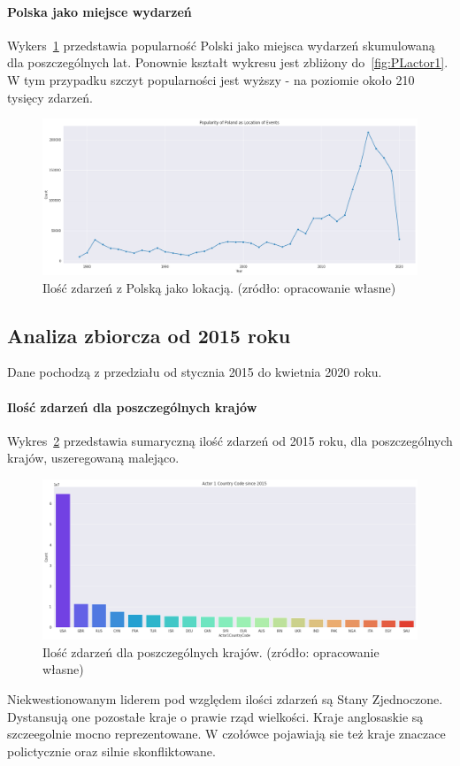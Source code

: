 \documentclass[11pt]{report}
\begin{document}
    \paragraph{Polska jako miejsce wydarzeń}
    Wykers~\ref{fig:PLlocation} przedstawia popularność Polski jako miejsca wydarzeń skumulowaną dla poszczególnych lat. Ponownie kształt wykresu jest zbliżony do~\ref{fig:PLactor1}. W tym przypadku szczyt popularności jest wyższy - na poziomie około 210 tysięcy zdarzeń.
    \begin{figure}[ht]
        \centering
        \includegraphics[width=1 \textwidth]{fig/PL/PLlocation.png}
        \caption{Ilość zdarzeń z Polską jako lokacją. (zródło: opracowanie własne)}
        \label{fig:PLlocation}
    \end{figure}

    \subsection{Analiza zbiorcza od 2015 roku}
    Dane pochodzą z przedziału od stycznia 2015 do kwietnia 2020 roku.

    \paragraph{Ilość zdarzeń dla poszczególnych krajów}
    Wykres~\ref{fig:GLOBALactor1} przedstawia sumaryczną ilość zdarzeń od 2015 roku, dla poszczególnych krajów, uszeregowaną malejąco.
    \begin{figure}[ht]
        \centering
        \includegraphics[width=1 \textwidth]{fig/GLOBAL/Actor1.png}
        \caption{Ilość zdarzeń dla poszczególnych krajów. (zródło: opracowanie własne)}
        \label{fig:GLOBALactor1}
    \end{figure}
    Niekwestionowanym liderem pod względem ilości zdarzeń są Stany Zjednoczone. Dystansują one pozostałe kraje o prawie rząd wielkości. Kraje anglosaskie są szczeegolnie mocno reprezentowane. W czołówce pojawiają sie też kraje znaczace polictycznie oraz silnie skonfliktowane.
\end{document}
